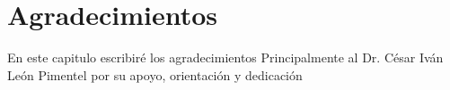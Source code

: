 \chapter{Agradecimientos}
En este capitulo escribiré los agradecimientos
Principalmente al Dr. César Iván León Pimentel por su apoyo, orientación y dedicación 

